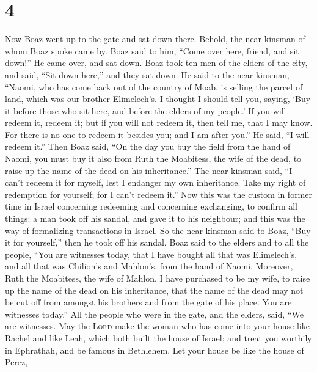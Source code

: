 \hypertarget{section-3}{%
\section{4}\label{section-3}}

 Now Boaz went up to the gate and sat down there. Behold,
the near kinsman of whom Boaz spoke came by. Boaz said to him, ``Come
over here, friend, and sit down!'' He came over, and sat down.
 Boaz took ten men of the elders of the city, and said,
``Sit down here,'' and they sat down.  He said to the near
kinsman, ``Naomi, who has come back out of the country of Moab, is
selling the parcel of land, which was our brother Elimelech's.
 I thought I should tell you, saying, `Buy it before those
who sit here, and before the elders of my people.' If you will redeem
it, redeem it; but if you will not redeem it, then tell me, that I may
know. For there is no one to redeem it besides you; and I am after
you.'' He said, ``I will redeem it.''  Then Boaz said,
``On the day you buy the field from the hand of Naomi, you must buy it
also from Ruth the Moabitess, the wife of the dead, to raise up the name
of the dead on his inheritance.''  The near kinsman said,
``I can't redeem it for myself, lest I endanger my own inheritance. Take
my right of redemption for yourself; for I can't redeem it.''
 Now this was the custom in former time in Israel
concerning redeeming and concerning exchanging, to confirm all things: a
man took off his sandal, and gave it to his neighbour; and this was the
way of formalizing transactions in Israel.  So the near
kinsman said to Boaz, ``Buy it for yourself,'' then he took off his
sandal.  Boaz said to the elders and to all the people,
``You are witnesses today, that I have bought all that was Elimelech's,
and all that was Chilion's and Mahlon's, from the hand of Naomi.
 Moreover, Ruth the Moabitess, the wife of Mahlon, I have
purchased to be my wife, to raise up the name of the dead on his
inheritance, that the name of the dead may not be cut off from amongst
his brothers and from the gate of his place. You are witnesses today.''
 All the people who were in the gate, and the elders,
said, ``We are witnesses. May the \textsc{Lord} make the woman who has
come into your house like Rachel and like Leah, which both built the
house of Israel; and treat you worthily in Ephrathah, and be famous in
Bethlehem.  Let your house be like the house of Perez,
